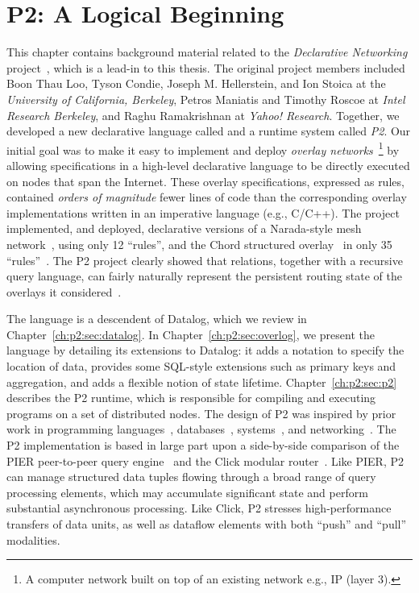 \chapter[P2: A Logical Beginning]{P2: A Logical Beginning}
\label{ch:p2}

This chapter contains background material related to the {\em Declarative
Networking} project~\cite{boon-thesis}, which is a lead-in to this thesis.  The
original project members included Boon Thau Loo, Tyson Condie, Joseph M.
Hellerstein, and Ion Stoica at the {\em University of California, Berkeley},
Petros Maniatis and Timothy Roscoe at {\em Intel Research Berkeley}, and Raghu
Ramakrishnan at {\em Yahoo!  Research}.  Together, we developed a new
declarative language called {\em \OVERLOG} and a runtime system called {\em
P2}.  Our initial goal was to make it easy to implement and deploy {\em
overlay networks}~\footnote{A computer network built on top of an existing
network e.g., IP (layer 3).} by allowing specifications in a high-level
declarative language to be directly executed on nodes that span the Internet.
These overlay specifications, expressed as \OVERLOG rules, contained {\em
orders of magnitude} fewer lines of code than the corresponding overlay
implementations written in an imperative language (e.g., C/C++).  The project
implemented, and deployed, declarative versions of a Narada-style mesh
network~\cite{chu00case}, using only 12 ``rules'', and the Chord structured
overlay~\cite{chord} in only 35 ``rules''~\cite{p2:sosp}.  The P2 project
clearly showed that relations, together with a recursive query language, can
fairly naturally represent the persistent routing state of the overlays it
considered~\cite{boon-thesis}.

The \OVERLOG language is a descendent of Datalog, which we review in
Chapter~\ref{ch:p2:sec:datalog}.  In Chapter~\ref{ch:p2:sec:overlog}, we
present the \OVERLOG language by detailing its extensions to Datalog: it adds a
notation to specify the location of data, provides some SQL-style extensions
such as primary keys and aggregation, and adds a flexible notion of state
lifetime.  Chapter~\ref{ch:p2:sec:p2} describes the P2 runtime, which is
responsible for compiling and executing \OVERLOG programs on a set of
distributed nodes.  The design of P2 was inspired by prior work in programming
languages~\cite{Shapiro84}, databases~\cite{nail, ldl, telegraphcq,
pier-cidr05}, systems~\cite{bamboo}, and networking~\cite{chord, click-tocs}.
The P2 implementation is based in large part upon a side-by-side comparison of
the PIER peer-to-peer query engine~\cite{pier-cidr05} and the Click modular
router~\cite{click-tocs}.  Like PIER, P2 can manage structured data tuples
flowing through a broad range of query processing elements, which may
accumulate significant state and perform substantial asynchronous processing.
Like Click, P2 stresses high-performance transfers of data units, as well as
dataflow elements with both ``push'' and ``pull'' modalities.

